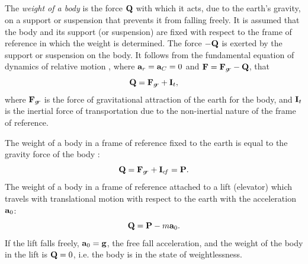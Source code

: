 \subsection{}\label{7.3.6} The \emph{weight of a body} is the force $\vb{Q}$ with which it acts, due to the earth's gravity, on a support or suspension that prevents it from falling freely. It is assumed that the body and its support (or suspension) are fixed with respect to the frame of reference in which the weight is determined. The force $-\vb{Q}$ is exerted by the support or suspension on the body. It follows from the fundamental equation of dynamics of rela­tive motion , where $\vb{a}_{r} =\vb{a}_{C} = 0$ and $\vb{F} = \vb{F}_{g\!r} - \vb{Q}$, that
\begin{equation*}%
\vb{Q} = \vb{F}_{g\!r} + \vb{I}_{t},
\end{equation*}
where $\vb{F}_{g\!r}$ is the force of gravitational attraction of the earth for the body, and $\vb{I}_{t}$ is the inertial force of transportation due to the non-inertial nature of the frame of reference. 

\noindent{} The weight of a body in a frame of reference fixed to the earth is equal to the gravity force of the body :
\begin{equation*}%
\vb{Q} = \vb{F}_{g\!r} + \vb{I}_{c\!f} = \vb{P}.
\end{equation*}
 The weight of a body in a frame of reference at­tached to a lift (elevator) which travels with translational motion with respect to the earth with the acceleration $\vb{a}_{0}$:
\begin{equation*}%
\vb{Q} = \vb{P} - m \vb{a}_{0}.
\end{equation*}
If the lift falls freely, $\vb{a}_{0}= \vb{g}$, the free fall acceleration, and the weight of the body in the lift is $\vb{Q} = 0$, i.e. the body is in the state of weightlessness.


